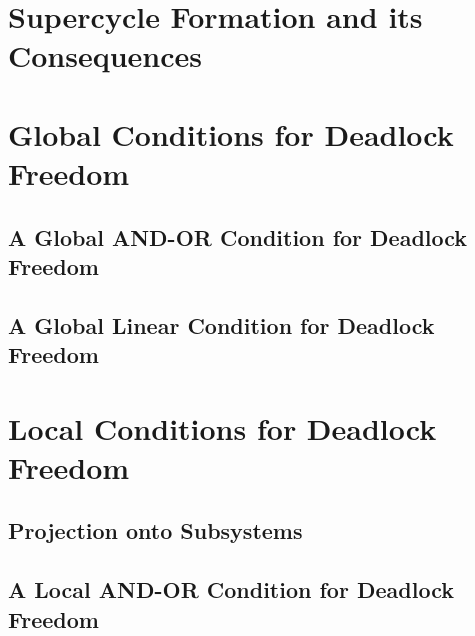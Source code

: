 \documentclass[11pt]{article}
\begin{document}
\section{Supercycle Formation and its Consequences}
\label{s:scFormation}



\section{Global Conditions for Deadlock Freedom}
\label{s:global}

   \label{s:global.preamble}
   

   \subsection{A Global AND-OR Condition for Deadlock Freedom}
   \label{s:global.ANDOR}
   

   \subsection{A Global Linear Condition for Deadlock Freedom}
   \label{s:globCondition}
   \label{s:global.Linear}
   


\section{Local Conditions for Deadlock Freedom}
\label{s:local}

   \label{s:local.preamble}
   

   \subsection{Projection onto Subsystems}
   \label{s:projection}
   

   \subsection{A Local AND-OR Condition for Deadlock Freedom}
   \label{s:ANDORcond}
   
\end{document}
